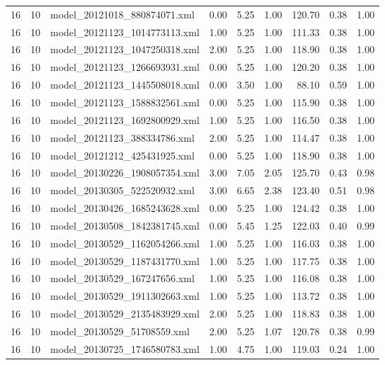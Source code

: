 \begin{table}[ht]
\begin{tabular}{rrlrrrrrr}
   16 &  10 & model\_20121018\_880874071.xml & 0.00 & 5.25 & 1.00 & 120.70 & 0.38 & 1.00 \\ 
   16 &  10 & model\_20121123\_1014773113.xml & 1.00 & 5.25 & 1.00 & 111.33 & 0.38 & 1.00 \\ 
   16 &  10 & model\_20121123\_1047250318.xml & 2.00 & 5.25 & 1.00 & 118.90 & 0.38 & 1.00 \\ 
   16 &  10 & model\_20121123\_1266693931.xml & 0.00 & 5.25 & 1.00 & 120.20 & 0.38 & 1.00 \\ 
   16 &  10 & model\_20121123\_1445508018.xml & 0.00 & 3.50 & 1.00 & 88.10 & 0.59 & 1.00 \\ 
   16 &  10 & model\_20121123\_1588832561.xml & 0.00 & 5.25 & 1.00 & 115.90 & 0.38 & 1.00 \\ 
   16 &  10 & model\_20121123\_1692800929.xml & 1.00 & 5.25 & 1.00 & 116.50 & 0.38 & 1.00 \\ 
   16 &  10 & model\_20121123\_388334786.xml & 2.00 & 5.25 & 1.00 & 114.47 & 0.38 & 1.00 \\ 
   16 &  10 & model\_20121212\_425431925.xml & 0.00 & 5.25 & 1.00 & 118.90 & 0.38 & 1.00 \\ 
   16 &  10 & model\_20130226\_1908057354.xml & 3.00 & 7.05 & 2.05 & 125.70 & 0.43 & 0.98 \\ 
   16 &  10 & model\_20130305\_522520932.xml & 3.00 & 6.65 & 2.38 & 123.40 & 0.51 & 0.98 \\ 
   16 &  10 & model\_20130426\_1685243628.xml & 0.00 & 5.25 & 1.00 & 124.42 & 0.38 & 1.00 \\ 
   16 &  10 & model\_20130508\_1842381745.xml & 0.00 & 5.45 & 1.25 & 122.03 & 0.40 & 0.99 \\ 
   16 &  10 & model\_20130529\_1162054266.xml & 1.00 & 5.25 & 1.00 & 116.03 & 0.38 & 1.00 \\ 
   16 &  10 & model\_20130529\_1187431770.xml & 1.00 & 5.25 & 1.00 & 117.75 & 0.38 & 1.00 \\ 
   16 &  10 & model\_20130529\_167247656.xml & 1.00 & 5.25 & 1.00 & 116.08 & 0.38 & 1.00 \\ 
   16 &  10 & model\_20130529\_1911302663.xml & 1.00 & 5.25 & 1.00 & 113.72 & 0.38 & 1.00 \\ 
   16 &  10 & model\_20130529\_2135483929.xml & 2.00 & 5.25 & 1.00 & 118.83 & 0.38 & 1.00 \\ 
   16 &  10 & model\_20130529\_51708559.xml & 2.00 & 5.25 & 1.07 & 120.78 & 0.38 & 0.99 \\ 
   16 &  10 & model\_20130725\_1746580783.xml & 1.00 & 4.75 & 1.00 & 119.03 & 0.24 & 1.00 \\ 

\end{tabular}
\end{table}
